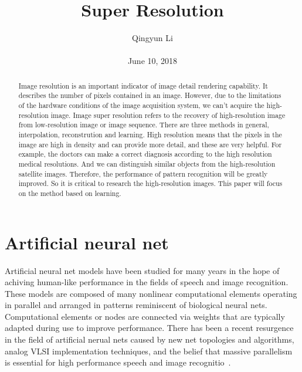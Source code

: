\documentclass[10pt,twocolumn,letterpaper]{article}
\begin{document}
\author{Qingyun Li\\\\
June 10, 2018}        
\title{Super Resolution}

\maketitle

\begin{abstract}
 \par
  Image resolution is an important indicator of image detail rendering capability. It describes the number of pixels contained in an image. However, due to the limitations of the hardware conditions of the image acquisition system, we can't acquire the high-resolution image. Image super resolution refers to the recovery of high-resolution image from low-resolution image or image sequence. There are three methods in general, interpolation, reconstrution and learning.  High resolution means that the pixels in the image are high in density and can provide more detail, and these are very helpful. For example, the doctors can make a correct diagnosis according to the high resolution medical resolutions. And we can distinguish similar objects from the high-resolution satellite images. Therefore, the performance of pattern recognition will be greatly improved. So it is critical to research the high-resolution images. This paper will focus on the method based on learning.
\end{abstract}
\section{Artificial neural net}
 \par Artificial neural net models have been studied for many years in the hope of achiving human-like performance in the fields of speech and image recognition. These models are composed of many nonlinear computational elements operating in parallel and arranged in patterns reminiscent of biological neural nets. Computational elements or nodes are connected via weights that are typically adapted during use to improve performance. There has been a recent resurgence in the field of artificial nerual nets caused by new net topologies and algorithms, analog VLSI implementation techniques, and the belief that massive parallelism is essential for high performance speech and image recognitio~\cite{lippmann1987introduction}.
 
 
\end{document}
